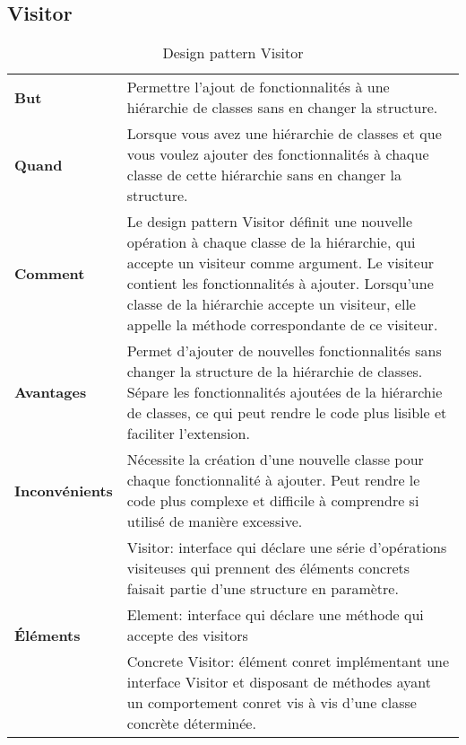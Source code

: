 \subsection{Visitor}\label{subsec:visitor}

\begin{table}[H]
\caption{Design pattern Visitor}
\label{tbl:design_patterns_visitor}
\begin{adjustbox}{max width=\textwidth}
\begin{tabular}{l|p{\textwidth}}
\toprule
\textbf{But} & Permettre l'ajout de fonctionnalités à une hiérarchie de classes sans en changer la structure. \\
\cmidrule(lr){1-2}
\textbf{Quand} & Lorsque vous avez une hiérarchie de classes et que vous voulez ajouter des fonctionnalités à chaque classe de cette hiérarchie sans en changer la structure. \\
\cmidrule(lr){1-2}
\textbf{Comment} & Le design pattern Visitor définit une nouvelle opération à chaque classe de la hiérarchie, qui accepte un visiteur comme argument. Le visiteur contient les fonctionnalités à ajouter. Lorsqu'une classe de la hiérarchie accepte un visiteur, elle appelle la méthode correspondante de ce visiteur. \\
\cmidrule(lr){1-2}
\textbf{Avantages} & Permet d'ajouter de nouvelles fonctionnalités sans changer la structure de la hiérarchie de classes. Sépare les fonctionnalités ajoutées de la hiérarchie de classes, ce qui peut rendre le code plus lisible et faciliter l'extension. \\
\cmidrule(lr){1-2}
\textbf{Inconvénients} & Nécessite la création d'une nouvelle classe pour chaque fonctionnalité à ajouter. Peut rendre le code plus complexe et difficile à comprendre si utilisé de manière excessive. \\
\cmidrule(lr){1-2}
\multirow{5}{*}{\textbf{\'El\'ements}} & Visitor: interface qui d\'eclare une s\'erie d'op\'erations  visiteuses qui prennent des \'el\'ements concrets faisait partie d'une structure en param\`etre. \\
& Element: interface qui d\'eclare une m\'ethode qui accepte des visitors \\
& Concrete Visitor: \'el\'ement conret impl\'ementant une interface Visitor et disposant de m\'ethodes ayant un comportement conret vis à vis d'une classe concr\`ete d\'etermin\'ee.\\

\end{tabular}
\end{adjustbox}
\end{table}
